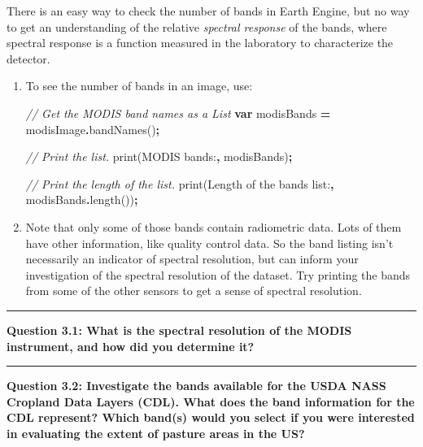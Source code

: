 \documentclass[
]{article}
\newenvironment{Shaded}{\begin{snugshade}}{\end{snugshade}}
\newcommand{\CommentTok}[1]{\textcolor[rgb]{0.56,0.35,0.01}{\textit{#1}}}
\newcommand{\FunctionTok}[1]{\textcolor[rgb]{0.00,0.00,0.00}{#1}}
\newcommand{\KeywordTok}[1]{\textcolor[rgb]{0.13,0.29,0.53}{\textbf{#1}}}
\newcommand{\NormalTok}[1]{#1}
\newcommand{\OperatorTok}[1]{\textcolor[rgb]{0.81,0.36,0.00}{\textbf{#1}}}
\newcommand{\StringTok}[1]{\textcolor[rgb]{0.31,0.60,0.02}{#1}}
\begin{document}
There is an easy way to check the number of bands in Earth Engine, but no way to get an understanding of the relative \emph{spectral response} of the bands, where spectral response is a function measured in the laboratory to characterize the detector.

\begin{enumerate}
\def\labelenumi{\arabic{enumi}.}
\item
  To see the number of bands in an image, use:

\begin{Shaded}
\begin{Highlighting}[]
\CommentTok{// Get the MODIS band names as a List}
\KeywordTok{var}\NormalTok{ modisBands }\OperatorTok{=}\NormalTok{ modisImage}\OperatorTok{.}\FunctionTok{bandNames}\NormalTok{()}\OperatorTok{;}

\CommentTok{// Print the list.}
\FunctionTok{print}\NormalTok{(}\StringTok{\textquotesingle{}MODIS bands:\textquotesingle{}}\OperatorTok{,}\NormalTok{ modisBands)}\OperatorTok{;}

\CommentTok{// Print the length of the list.}
\FunctionTok{print}\NormalTok{(}\StringTok{\textquotesingle{}Length of the bands list:\textquotesingle{}}\OperatorTok{,}\NormalTok{ modisBands}\OperatorTok{.}\FunctionTok{length}\NormalTok{())}\OperatorTok{;}
\end{Highlighting}
\end{Shaded}
\item
  Note that only some of those bands contain radiometric data. Lots of them have other information, like quality control data. So the band listing isn't necessarily an indicator of spectral resolution, but can inform your investigation of the spectral resolution of the dataset. Try printing the bands from some of the other sensors to get a sense of spectral resolution.
\end{enumerate}

\begin{center}\rule{0.5\linewidth}{0.5pt}\end{center}

\textbf{Question 3.1: What is the spectral resolution of the MODIS instrument, and how did you determine it?}

\begin{center}\rule{0.5\linewidth}{0.5pt}\end{center}

\textbf{Question 3.2: Investigate the bands available for the USDA NASS Cropland Data Layers (CDL). What does the band information for the CDL represent? Which band(s) would you select if you were interested in evaluating the extent of pasture areas in the US? }
\end{document}
